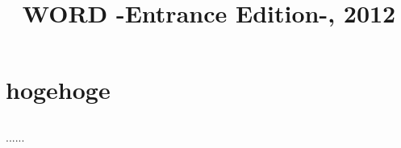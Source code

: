 \documentclass{word}
\title{WORD -Entrance Edition-, 2012}
\begin{document}
\chapter{hogehoge}


\section{}
......
\end{document}
